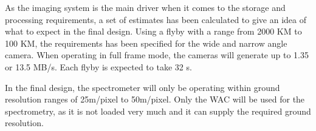 As the imaging system is the main driver when it comes to the storage and processing requirements, a set of estimates has been calculated to give an idea of what to expect in the final design. Using a flyby with a range from 2000 KM to 100 KM, the requirements has been specified for the wide and narrow angle camera. When operating in full frame mode, the cameras will generate up to 1.35 or 13.5 MB/s. Each flyby is expected to take 32 s.

In the final design, the spectrometer will only be operating within ground resolution ranges of 25m/pixel to 50m/pixel. Only the WAC will be used for the spectrometry, as it is not loaded very much and it can supply the required ground resolution.
